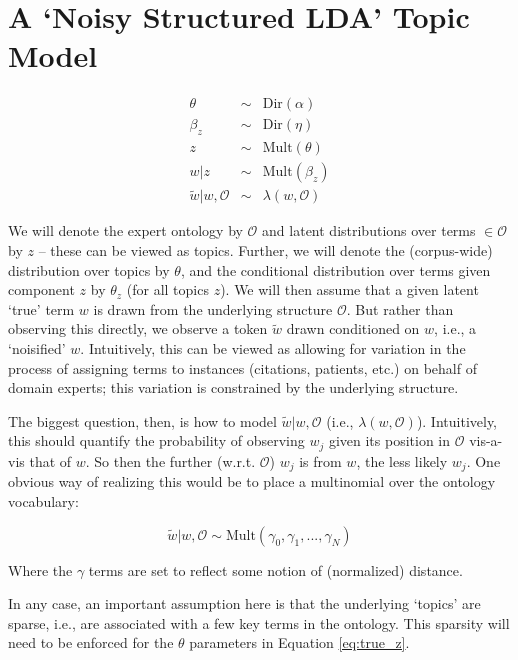 \documentclass[]{article}
\begin{document}
\section{A `Noisy Structured LDA' Topic Model}	

\begin{eqnarray}
 \theta &\sim& \textrm{Dir}(\alpha) \\
  \beta_z &\sim& \textrm{Dir}({\eta})  \\
  z &\sim& \textrm{Mult}(\theta) \label{eq:true_z}\\
  w|z &\sim& \textrm{Mult}(\beta_z) \\
  \tilde{w}|w,\mathcal{O} &\sim& \lambda(w, \mathcal{O})
\end{eqnarray}


We will denote the expert ontology by $\mathcal{O}$ and latent distributions over terms $\in \mathcal{O}$ by $z$ -- these can be viewed as topics. Further, we will denote the (corpus-wide) distribution over topics by $\theta$, and the conditional distribution over terms given component $z$ by $\theta_z$ (for all topics $z$). We will then assume that a given latent `true' term $w$ is drawn from the underlying structure $\mathcal{O}$. But rather than observing this directly, we observe a token $\tilde{w}$ drawn conditioned on $w$, i.e., a `noisified' $w$. Intuitively, this can be viewed as allowing for variation in the process of assigning terms to instances (citations, patients, etc.) on behalf of domain experts; this variation is constrained by the underlying structure.

The biggest question, then, is how to model $\tilde{w}|w,\mathcal{O}$ (i.e., $\lambda(w, \mathcal{O})$). Intuitively, this should quantify the probability of observing $w_j$ given its position in $\mathcal{O}$ vis-a-vis that of $w$. So then the further (w.r.t. $\mathcal{O}$) $w_j$ is from $w$, the less likely $w_j$. One obvious way of realizing this would be to place a multinomial over the ontology vocabulary:

\begin{equation}
	\tilde{w}|w,\mathcal{O} \sim \textrm{Mult}(\gamma_0, \gamma_1, ... , \gamma_N)
\end{equation}

\noindent Where the $\gamma$ terms are set to reflect some notion of (normalized) distance. 

In any case, an important assumption here is that the underlying `topics' are sparse, i.e., are associated with a few key terms in the ontology. This sparsity will need to be enforced for the $\theta$ parameters in Equation \ref{eq:true_z}.



%
%
\end{document}
